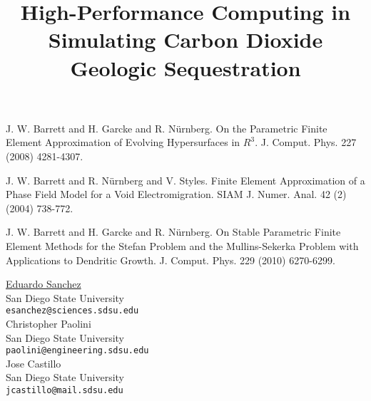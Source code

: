 \documentclass[article,A4,11pt]{llncs}%
\begin{document}

\begin{thebibliography}{10}
{\sc J. W. Barrett and H. Garcke and R. N\"{u}rnberg}. {On the Parametric Finite Element Approximation of Evolving Hypersurfaces in ${R}^3$}. J. Comput. Phys. 227 (2008) 4281-4307.

{\sc J. W. Barrett and R. N\"{u}rnberg and V. Styles}. {Finite Element Approximation of a Phase Field Model for a Void Electromigration}. SIAM J. Numer. Anal.  42 (2) (2004) 738-772.

{\sc J. W. Barrett and H. Garcke and R. N\"{u}rnberg}. {On Stable Parametric Finite Element Methods for the Stefan Problem and the Mullins-Sekerka Problem with Applications to Dendritic Growth}. J. Comput. Phys. 229 (2010) 6270-6299.
\end{thebibliography}

\title{High-Performance Computing in Simulating Carbon Dioxide Geologic Sequestration}
 \author{} \institute{}
\maketitle
\begin{center}
{\large \underline{Eduardo Sanchez}}\\
San Diego State University\\
{\tt esanchez@sciences.sdsu.edu}
\\ \vspace{4mm}
{\large Christopher Paolini}\\
San Diego State University\\
{\tt paolini@engineering.sdsu.edu}
\\ \vspace{4mm}
{\large Jose Castillo}\\
San Diego State University\\
{\tt jcastillo@mail.sdsu.edu}
\end{center}
\end{document}
